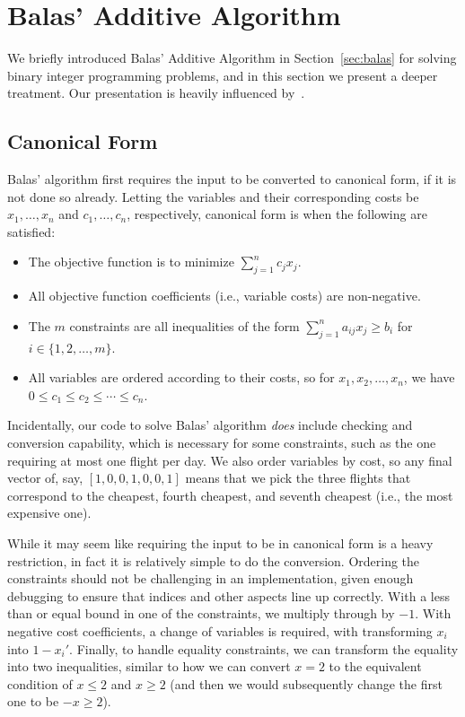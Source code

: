 \documentclass{article}
\begin{document}
\section{Balas' Additive Algorithm}\label{app:balas}

We briefly introduced Balas' Additive Algorithm in Section~\ref{sec:balas} for solving binary integer programming problems, and in this section we
present a deeper treatment. Our presentation is heavily influenced by~\cite{carleton}.

\subsection{Canonical Form}

Balas' algorithm first requires the input to be converted to canonical form, if it is not done so already. Letting the variables and their
corresponding costs be $x_1, \ldots, x_n$ and $c_1, \ldots, c_n$, respectively, canonical form is when the following are satisfied:

\begin{itemize}[noitemsep]
    \item The objective function is to minimize $\sum_{j=1}^n c_jx_j$.
    \item All objective function coefficients (i.e., variable costs) are non-negative. 
    \item The $m$ constraints are all inequalities of the form $\sum_{j=1}^{n} a_{ij}x_j \ge b_i$ for $i \in \{1,2,\ldots,m\}$.
    \item All variables are ordered according to their costs, so for $x_1, x_2, \ldots, x_n$, we have $0 \le c_1 \le c_2 \le \cdots \le c_n$. 
\end{itemize}

Incidentally, our code to solve Balas' algorithm \emph{does} include checking and conversion capability, which is necessary for some constraints, such
as the one requiring at most one flight per day. We also order variables by cost, so any final vector of, say, $[1,0,0,1,0,0,1]$ means that we pick
the three flights that correspond to the cheapest, fourth cheapest, and seventh cheapest (i.e., the most expensive one).

While it may seem like requiring the input to be in canonical form is a heavy restriction, in fact it is relatively simple to do the conversion.
Ordering the constraints should not be challenging in an implementation, given enough debugging to ensure that indices and other aspects line up
correctly. With a less than or equal bound in one of the constraints, we multiply through by $-1$. With negative cost coefficients, a change of
variables is required, with transforming $x_i$ into $1-x_i'$. Finally, to handle equality constraints, we can transform the equality into two
inequalities, similar to how we can convert $x=2$ to the equivalent condition of $x\le2$ and $x\ge2$ (and then we would subsequently change the first
one to be $-x\ge2$).
\end{document}
